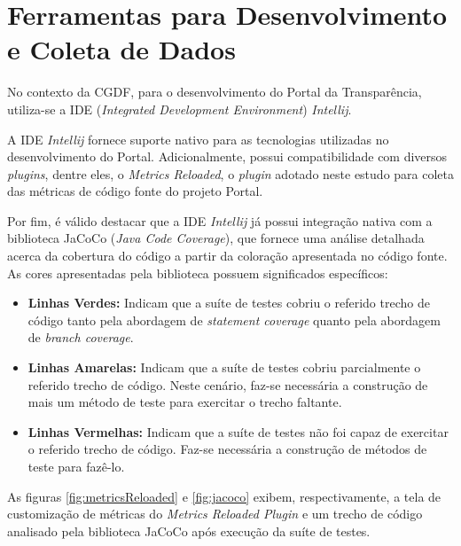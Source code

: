 \clearpage

\section{Ferramentas para Desenvolvimento e Coleta de Dados}

No contexto da CGDF, para o desenvolvimento do Portal da Transparência, utiliza-se a IDE (\textit{Integrated Development Environment}) \textit{Intellij}.

A IDE \textit{Intellij} fornece suporte nativo para as tecnologias utilizadas no desenvolvimento do Portal. Adicionalmente, possui compatibilidade com diversos \textit{plugins}, dentre eles, o \textit{Metrics Reloaded}, o \textit{plugin} adotado neste estudo para coleta das métricas de código fonte do projeto Portal.

Por fim, é válido destacar que a IDE \textit{Intellij} já possui integração nativa com a biblioteca JaCoCo (\textit{Java Code Coverage}), que fornece uma análise detalhada acerca da cobertura do código a partir da coloração apresentada no código fonte. As cores apresentadas pela biblioteca possuem significados específicos:

\begin{itemize}
	\item \textbf{Linhas Verdes:} Indicam que a suíte de testes cobriu o referido trecho de código tanto pela abordagem de \textit{statement coverage} quanto pela abordagem de \textit{branch coverage}.

	\item \textbf{Linhas Amarelas:} Indicam que a suíte de testes cobriu parcialmente o referido trecho de código. Neste cenário, faz-se necessária a construção de mais um método de teste para exercitar o trecho faltante.

	\item \textbf{Linhas Vermelhas:} Indicam que a suíte de testes não foi capaz de exercitar o referido trecho de código. Faz-se necessária a construção de métodos de teste para fazê-lo.
\end{itemize}

As figuras \ref{fig:metricsReloaded} e \ref{fig:jacoco} exibem, respectivamente, a tela de customização de métricas do \textit{Metrics Reloaded Plugin} e um trecho de código analisado pela biblioteca JaCoCo após execução da suíte de testes.

